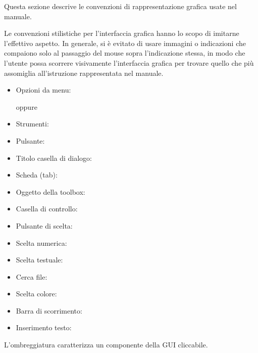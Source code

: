 

\label{label_conventions}

Questa sezione descrive le convenzioni di rappresentazione grafica usate nel manuale.


Le convenzioni stilistiche per l'interfaccia grafica hanno lo scopo di imitarne l'effettivo aspetto. In generale, 
si è evitato di usare immagini o indicazioni che compaiono solo al passaggio del mouse sopra l'indicazione stessa, 
in modo che l'utente possa scorrere visivamente l'interfaccia grafica per trovare quello che più assomiglia 
all'istruzione rappresentata nel manuale.

\begin{itemize}[label=--,itemsep=5pt]
\item  Opzioni da menu:  \arrow
{}

oppure

 \arrow
{} \arrow {}
\item Strumenti: 
\item Pulsante: 
\item Titolo casella di dialogo: 
\item Scheda (tab): 
\item Oggetto della toolbox: 
\item Casella di controllo: 
\item Pulsante di scelta:   
\item Scelta numerica: 
\item Scelta testuale: 
\item Cerca file: \browsebutton
\item Scelta colore: 
\item Barra di scorrimento: 
\item Inserimento testo: 
\end{itemize}
L'ombreggiatura caratterizza un componente della GUI cliccabile.

